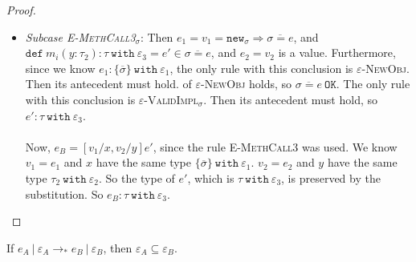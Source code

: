 \documentclass{llncs}
\newcommand{\keywadj}[1]{\mathtt{#1}}
\newcommand{\keyw}[1]{\keywadj{#1}~}
\begin{document}
\begin{proof}
\begin{pcases}
\begin{itemize}
	\newpage
	
	\item[] \textit{Subcase \textsc{E-MethCall3$_{\sigma}$}}: Then $e_1 = v_1 = \keywadj{new}_{\sigma} \Rightarrow \overline{\sigma = e}$, and $\keyw{def} m_i(y : \tau_2) : \tau~\keyw{with} \varepsilon_3 = e' \in \overline{\sigma = e}$, and $e_2 = v_2$ is a value. Furthermore, since we know $e_1  : \{ \overline \sigma \}~ \keyw{with} \varepsilon_1$, the only rule with this conclusion is \textsc{$\varepsilon$-NewObj}. Then its antecedent must hold. of \textsc{$\varepsilon$-NewObj} holds, so $\overline{ \sigma = e }~\keywadj{OK}$. The only rule with this conclusion is \textsc{$\varepsilon$-ValidImpl$_{\sigma}$}. Then its antecedent must hold, so $e' : \tau~\keyw{with} \varepsilon_3$.
	
	\paragraph{}
	Now, $e_B = [v_1/x, v_2/y]e'$, since the rule \textsc{E-MethCall3} was used. We know $v_1 = e_1$ and $x$ have the same type $\{ \overline \sigma \}~ \keyw{with} \varepsilon_1$. $v_2 = e_2$ and $y$ have the same type $\tau_2~\keyw{with} \varepsilon_2$. So the type of $e'$, which is $\tau~\keyw{with} \varepsilon_3$, is preserved by the substitution. So $e_B : \tau~\keyw{with} \varepsilon_3$.

\end{itemize}

\end{pcases}

\end{proof}


\begin{theorem}[Monotonicity]
If $e_A~|~\varepsilon_A \longrightarrow_* e_B~|~\varepsilon_B$, then $\varepsilon_A \subseteq \varepsilon_B$.
\end{theorem}
\end{document}
